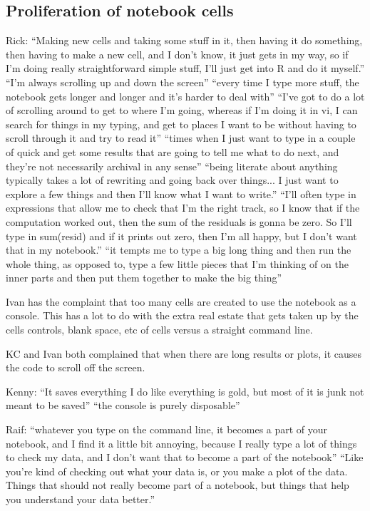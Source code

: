 \subsection{Proliferation of notebook cells}
Rick: ``Making new cells and taking some stuff in it, then having it do
something, then having to make a new cell, and I don't know, it just gets in my
way, so if I'm doing really straightforward simple stuff, I'll just get into R
and do it myself.'' ``I'm always scrolling up and down the screen'' ``every time
I type more stuff, the notebook gets longer and longer and it's harder to deal
with'' ``I've got to do a lot of scrolling around to get to where I'm going,
whereas if I'm doing it in vi, I can search for things in my typing, and get to
places I want to be without having to scroll through it and try to read it''
``times when I just want to type in a couple of quick and get some results that
are going to tell me what to do next, and they're not necessarily archival in
any sense'' ``being literate about anything typically takes a lot of rewriting
and going back over things... I just want to explore a few things and then I'll
know what I want to write.'' ``I'll often type in expressions that allow me to
check that I'm the right track, so I know that if the computation worked out,
then the sum of the residuals is gonna be zero. So I'll type in sum(resid) and
if it prints out zero, then I'm all happy, but I don't want that in my
notebook.'' ``it tempts me to type a big long thing and then run the whole
thing, as opposed to, type a few little pieces that I'm thinking of on the inner
parts and then put them together to make the big thing''

Ivan has the complaint that too many cells are created to use the notebook as a
console.  This has a lot to do with the extra real estate that gets taken up by
the cells controls, blank space, etc of cells versus a straight command line.

KC and Ivan both complained that when there are long results or plots, it causes
the code to scroll off the screen.

Kenny: ``It saves everything I do like everything is gold, but most of it is
junk not meant to be saved'' ``the console is purely disposable''

Raif: ``whatever you type on the command line, it becomes a part of your
notebook, and I find it a little bit annoying, because I really type a lot of
things to check my data, and I don't want that to become a part of the
notebook'' ``Like you're kind of checking out what your data is, or you make a
plot of the data. Things that should not really become part of a notebook, but
things that help you understand your data better.''

